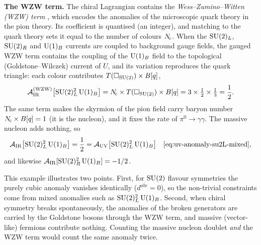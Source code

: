 \documentclass[11pt,a4paper]{article}
\begin{document}
\textbf{The WZW term.}\;
The chiral Lagrangian contains the \emph{Wess--Zumino--Witten (WZW) term}
\cite{WessZumino1971,Witten1983}, which encodes the anomalies of the
microscopic quark theory in the pion theory.  Its coefficient is
quantised (an integer), and matching to the quark theory sets it equal to
the number of colours $N_{\!c}$.  When the $\mathrm{SU}(2)_L$, $\mathrm{SU}(2)_R$ and
$\mathrm{U}(1)_B$ currents are coupled to background gauge fields, the gauged
WZW term contains the coupling of the $\mathrm{U}(1)_B$ field to the topological
(Goldstone--Wilczek) current of $U$, and its variation reproduces the
quark triangle: each colour contributes $T(\square_{\mathrm{SU}(2)}) \times B[q]$,
\begin{equation}
  \mathcal{A}_{\mathrm{IR}}^{\text{(WZW)}}\bigl[\mathrm{SU}(2)_L^2\,\mathrm{U}(1)_B\bigr]
  = N_{\!c} \times T(\square_{\mathrm{SU}(2)}) \times B[q]
  = 3 \times \tfrac{1}{2} \times \tfrac{1}{3}
  = \frac{1}{2}.
  \label{eq:ir-anomaly-wzw}
\end{equation}
The same term makes the skyrmion of the pion field carry baryon number
$N_{\!c} \times B[q] = 1$ (it is the nucleon), and it fixes the rate of
$\pi^0 \to \gamma\gamma$.  The massive nucleon adds nothing, so
\begin{equation}
  \mathcal{A}_{\mathrm{IR}}\bigl[\mathrm{SU}(2)_L^2\,\mathrm{U}(1)_B\bigr]
  = \frac{1}{2}
  = \mathcal{A}_{\mathrm{UV}}\bigl[\mathrm{SU}(2)_L^2\,\mathrm{U}(1)_B\bigr]
  \quad\text{\eqref{eq:uv-anomaly-su2L-mixed}},
  \label{eq:ir-anomaly-matched}
\end{equation}
and likewise $\mathcal{A}_{\mathrm{IR}}[\mathrm{SU}(2)_R^2\,\mathrm{U}(1)_B] = -1/2$.

\begin{remark}
  This example illustrates two points.  First, for $\mathrm{SU}(2)$ flavour
  symmetries the purely cubic anomaly vanishes identically
  ($d^{abc} = 0$), so the non-trivial constraints come from mixed
  anomalies such as $\mathrm{SU}(2)_L^2\,\mathrm{U}(1)_B$.  Second, when chiral symmetry
  breaks spontaneously, the anomalies of the broken generators are carried
  by the Goldstone bosons through the WZW term, and massive (vector-like)
  fermions contribute nothing.  Counting the massive nucleon doublet
  \emph{and} the WZW term would count the same anomaly twice.
\end{remark}
\end{document}
